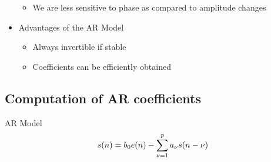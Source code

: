 \begin{itemize}
\begin{itemize}
\item We are less sensitive to phase as compared to amplitude changes

\end{itemize}

\item Advantages of the AR Model

\begin{itemize}

\item Always invertible if stable

\item Coefficients can be efficiently obtained

\end{itemize}

\end{itemize}


\subsection{Computation of AR coefficients}

AR Model
\begin{equation}s(n) = b_0e(n) - \sum_{\nu =  1}^{p}a_{\nu}s(n - \nu)\end{equation}

